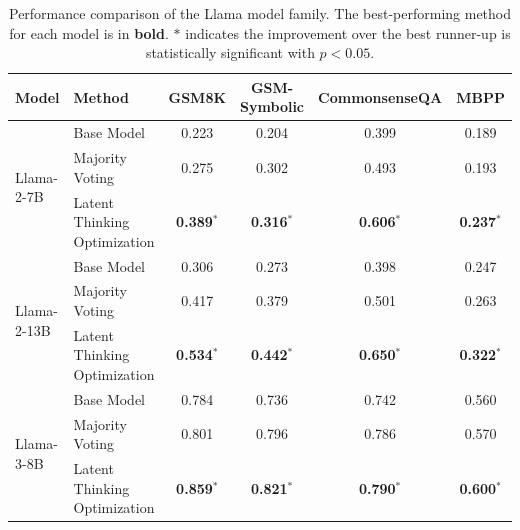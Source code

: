 \begin{table}[t]
\centering
\small
\newcommand{\supscriptspace}{\makebox[\widthof{$^{*}$}]{}} 
\setlength{\tabcolsep}{4pt}
\caption{Performance comparison of the Llama model family. 
The best-performing method for each model is in \textbf{bold}. $*$ indicates the improvement over the best runner-up is statistically significant with $p < 0.05$.}
\begin{tabular}{llcccc}
\toprule
\textbf{Model} & \textbf{Method} & \textbf{GSM8K} & \textbf{GSM-Symbolic} & \textbf{CommonsenseQA} & \textbf{MBPP} \\
\midrule

\multirow{3}{*}{Llama-2-7B}
& Base Model                   & 0.223 & 0.204 & 0.399 & 0.189 \\
& Majority Voting              & 0.275 & 0.302 & 0.493 & 0.193 \\
& Latent Thinking Optimization 
& \supscriptspace\textbf{0.389}$^{*}$ 
& \supscriptspace\textbf{0.316}$^{*}$ 
& \supscriptspace\textbf{0.606}$^{*}$ 
& \supscriptspace\textbf{0.237}$^{*}$ \\
\midrule

\multirow{3}{*}{Llama-2-13B}
& Base Model                   & 0.306 & 0.273 & 0.398 & 0.247 \\
& Majority Voting              & 0.417 & 0.379 & 0.501 & 0.263 \\
& Latent Thinking Optimization 
& \supscriptspace\textbf{0.534}$^{*}$ 
& \supscriptspace\textbf{0.442}$^{*}$ 
& \supscriptspace\textbf{0.650}$^{*}$ 
& \supscriptspace\textbf{0.322}$^{*}$ \\
\midrule

\multirow{3}{*}{Llama-3-8B}
& Base Model                   & 0.784 & 0.736 & 0.742 & 0.560 \\
& Majority Voting              & 0.801 & 0.796 & 0.786 & 0.570 \\
& Latent Thinking Optimization 
& \supscriptspace\textbf{0.859}$^{*}$ 
& \supscriptspace\textbf{0.821}$^{*}$ 
& \supscriptspace\textbf{0.790}$^{*}$ 
& \supscriptspace\textbf{0.600}$^{*}$ \\
\bottomrule
\end{tabular}
\label{tab:llama_results}
\end{table}
